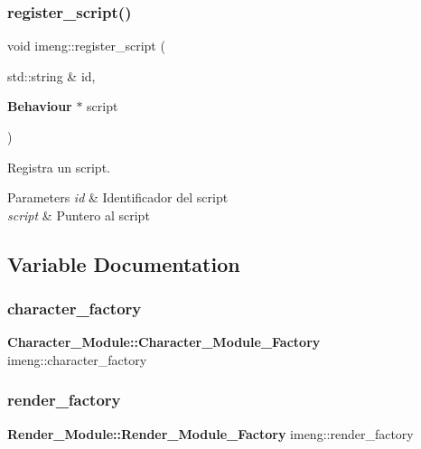 \mbox{\label{namespaceimeng_ae210d90faa6159b6eb1bc4b554d20032}} 
\subsubsection{register\_script()}
{\footnotesize\ttfamily void imeng\+::register\+\_\+script (\begin{DoxyParamCaption}\item[{std\+::string \&}]{id,  }\item[{\textbf{ Behaviour} $\ast$}]{script }\end{DoxyParamCaption})\hspace{0.3cm}{\ttfamily [inline]}}



Registra un script. 


\begin{DoxyParams}{Parameters}
{\em id} & Identificador del script \\
\hline
{\em script} & Puntero al script \\
\hline
\end{DoxyParams}


\subsection{Variable Documentation}
\mbox{\label{namespaceimeng_adbe577dac1abc72308b46557969bd9db}} 
\subsubsection{character\_factory}
{\footnotesize\ttfamily \textbf{ Character\+\_\+\+Module\+::\+Character\+\_\+\+Module\+\_\+\+Factory} imeng\+::character\+\_\+factory}

\mbox{\label{namespaceimeng_a8a5c2b8dcc692aabc6a69d2118c7782e}} 
\subsubsection{render\_factory}
{\footnotesize\ttfamily \textbf{ Render\+\_\+\+Module\+::\+Render\+\_\+\+Module\+\_\+\+Factory} imeng\+::render\+\_\+factory}

\mbox{\label{namespaceimeng_aaf4a3df4301903895d8a451efbffe355}} 
